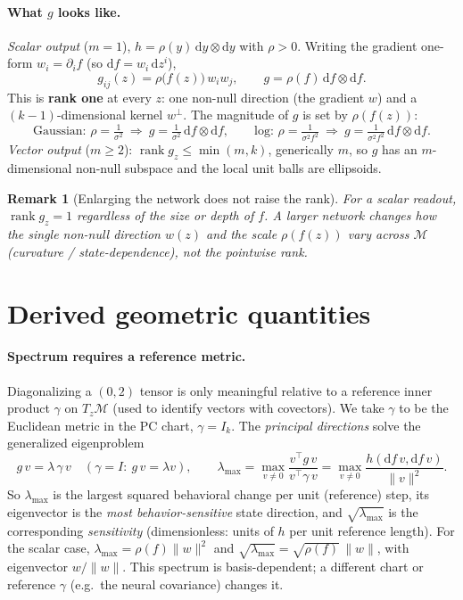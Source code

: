 \documentclass[11pt]{article}
\newtheorem{remark}{Remark}
\newcommand{\M}{\mathcal{M}}
\newcommand{\T}{T}
\newcommand{\rank}{\operatorname{rank}}
\newcommand{\dd}{\mathrm{d}}
\begin{document}
\paragraph{What $g$ looks like.}
\emph{Scalar output} ($m=1$), $h=\rho(y)\,\dd y\otimes\dd y$ with $\rho>0$. Writing the
gradient one-form $w_{i}=\partial_{i}f$ (so $\dd f=w_{i}\,\dd z^{i}$),
\[
  g_{ij}(z)=\rho\big(f(z)\big)\,w_{i}w_{j},\qquad
  g=\rho(f)\,\dd f\otimes \dd f .
\]
This is \textbf{rank one} at every $z$: one non-null direction (the gradient $w$) and a
$(k-1)$-dimensional kernel $w^{\perp}$. The magnitude of $g$ is set by $\rho(f(z))$:
\[
  \text{Gaussian: } \rho=\tfrac1{\sigma^{2}}\ \Rightarrow\ g=\tfrac1{\sigma^{2}}\,\dd f\otimes\dd f,
  \qquad
  \text{log: } \rho=\tfrac1{\sigma^{2}f^{2}}\ \Rightarrow\ g=\tfrac1{\sigma^{2}f^{2}}\,\dd f\otimes\dd f .
\]
\emph{Vector output} ($m\ge2$): $\rank g_{z}\le\min(m,k)$, generically $m$, so $g$ has an
$m$-dimensional non-null subspace and the local unit balls are ellipsoids.

\begin{remark}[Enlarging the network does not raise the rank]
For a scalar readout, $\rank g_{z}=1$ regardless of the size or depth of $f$. A larger
network changes how the single non-null direction $w(z)$ and the scale $\rho(f(z))$
\emph{vary} across $\M$ (curvature / state-dependence), not the pointwise rank.
\end{remark}

\section{Derived geometric quantities}\label{sec:derived}

\paragraph{Spectrum requires a reference metric.}
Diagonalizing a $(0,2)$ tensor is only meaningful relative to a reference inner product
$\gamma$ on $\T_{z}\M$ (used to identify vectors with covectors). We take $\gamma$ to be the
Euclidean metric in the PC chart, $\gamma=I_{k}$. The \emph{principal directions} solve the
generalized eigenproblem
\[
  g\,v=\lambda\,\gamma\,v \quad(\gamma=I:\ g\,v=\lambda v),\qquad
  \lambda_{\max}=\max_{v\ne0}\frac{v^{\top}g\,v}{v^{\top}\gamma\,v}
              =\max_{v\ne0}\frac{h(\dd f\,v,\dd f\,v)}{\|v\|^{2}} .
\]
So $\lambda_{\max}$ is the largest squared behavioral change per unit (reference) step, its
eigenvector is the \emph{most behavior-sensitive} state direction, and
$\sqrt{\lambda_{\max}}$ is the corresponding \emph{sensitivity} (dimensionless: units of
$h$ per unit reference length). For the scalar case, $\lambda_{\max}=\rho(f)\|w\|^{2}$ and
$\sqrt{\lambda_{\max}}=\sqrt{\rho(f)}\,\|w\|$, with eigenvector $w/\|w\|$. This spectrum is
basis-dependent; a different chart or reference $\gamma$ (e.g.\ the neural covariance) changes
it.
\end{document}
